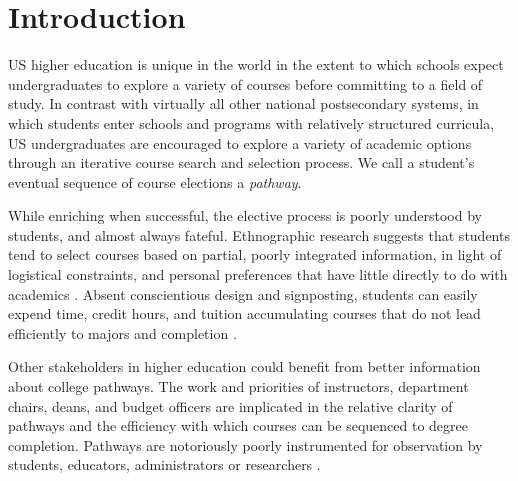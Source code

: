 \section{Introduction}



US higher education is unique in the world in the extent to
which schools expect undergraduates to explore a variety of courses before committing to a field of study. In contrast with virtually all other national postsecondary systems, in which students enter schools and programs with relatively structured curricula, US undergraduates are encouraged to explore a variety of academic options through an
iterative course search and selection process. We call a student's
eventual sequence of course elections a {\it pathway}.

While enriching when successful, the elective process is poorly understood by students, and almost always fateful. Ethnographic research suggests that students tend to select courses based on partial, poorly integrated information, in light of logistical constraints, and personal preferences that have little directly to do with academics \cite{nathan2006my,rosenbaum2011complexities, rosenbaum2007after}. Absent conscientious design and signposting, students can easily expend time, credit hours, and tuition accumulating courses that do not lead efficiently to majors and completion \cite{bailey2015redesigning}.  

Other stakeholders in higher education could benefit from better information about college pathways. The work and priorities of instructors, department chairs, deans, and budget officers are implicated in the relative clarity of pathways and the efficiency with which courses can be sequenced to degree completion. Pathways are notoriously poorly instrumented for observation by students, educators, administrators or researchers \cite{chambliss2014college}.



